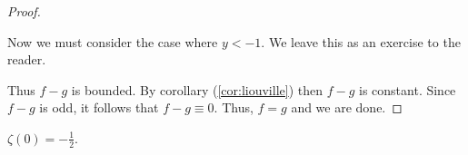 \begin{proof}
\begin{enumerate}
Now we must consider the case where $y<-1$. We leave this as an exercise to the reader.
\end{enumerate}

Thus $f-g$ is bounded. By corollary (\ref{cor:liouville}) then $f-g$ is constant. Since $f-g$ is odd, it follows that $f-g \equiv 0$. Thus, $f=g$ and we are done.



\end{proof}











\begin{corollary}\label{cor:z-zero}
$\zeta(0) = - \frac{1}{2}$.
\end{corollary}

